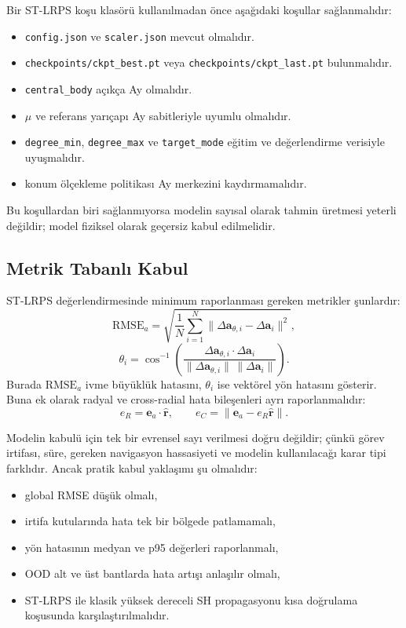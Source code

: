 Bir ST-LRPS koşu klasörü kullanılmadan önce aşağıdaki koşullar sağlanmalıdır:
\begin{itemize}
    \item \texttt{config.json} ve \texttt{scaler.json} mevcut olmalıdır.
    \item \texttt{checkpoints/ckpt\_best.pt} veya \texttt{checkpoints/ckpt\_last.pt} bulunmalıdır.
    \item \texttt{central\_body} açıkça Ay olmalıdır.
    \item \(\mu\) ve referans yarıçapı Ay sabitleriyle uyumlu olmalıdır.
    \item \texttt{degree\_min}, \texttt{degree\_max} ve \texttt{target\_mode} eğitim ve değerlendirme verisiyle uyuşmalıdır.
    \item konum ölçekleme politikası Ay merkezini kaydırmamalıdır.
\end{itemize}

Bu koşullardan biri sağlanmıyorsa modelin sayısal olarak tahmin üretmesi yeterli değildir; model fiziksel olarak geçersiz kabul edilmelidir.

\subsection{Metrik Tabanlı Kabul}

ST-LRPS değerlendirmesinde minimum raporlanması gereken metrikler şunlardır:
\[
\mathrm{RMSE}_{a}
=
\sqrt{
\frac{1}{N}
\sum_{i=1}^{N}
\|\Delta\mathbf{a}_{\theta,i}-\Delta\mathbf{a}_{i}\|^2
},
\]
\[
\theta_i
=
\cos^{-1}
\left(
\frac{
\Delta\mathbf{a}_{\theta,i}\cdot\Delta\mathbf{a}_{i}
}{
\|\Delta\mathbf{a}_{\theta,i}\|\,\|\Delta\mathbf{a}_{i}\|
}
\right).
\]
Burada \(\mathrm{RMSE}_a\) ivme büyüklük hatasını, \(\theta_i\) ise vektörel yön hatasını gösterir. Buna ek olarak radyal ve cross-radial hata bileşenleri ayrı raporlanmalıdır:
\[
e_R = \mathbf{e}_a\cdot\hat{\mathbf{r}},
\qquad
e_C = \|\mathbf{e}_a-e_R\hat{\mathbf{r}}\|.
\]

Modelin kabulü için tek bir evrensel sayı verilmesi doğru değildir; çünkü görev irtifası, süre, gereken navigasyon hassasiyeti ve modelin kullanılacağı karar tipi farklıdır. Ancak pratik kabul yaklaşımı şu olmalıdır:
\begin{itemize}
    \item global RMSE düşük olmalı,
    \item irtifa kutularında hata tek bir bölgede patlamamalı,
    \item yön hatasının medyan ve p95 değerleri raporlanmalı,
    \item OOD alt ve üst bantlarda hata artışı anlaşılır olmalı,
    \item ST-LRPS ile klasik yüksek dereceli SH propagasyonu kısa doğrulama koşusunda karşılaştırılmalıdır.
\end{itemize}

